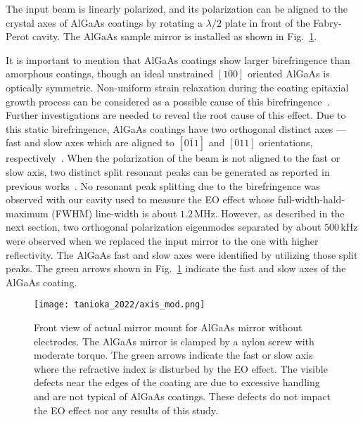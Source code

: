 The input beam is linearly polarized, and its polarization can be aligned to the crystal axes of AlGaAs coatings by rotating a $\lambda/2$ plate in front of the Fabry-Perot cavity.
The AlGaAs sample mirror is installed as shown in Fig.~\ref{fig.mount}.

It is important to mention that AlGaAs coatings show larger birefringence than amorphous coatings, though an ideal unstrained $[100]$ oriented AlGaAs is optically symmetric.
Non-uniform strain relaxation during the coating epitaxial growth process can be considered as a possible cause of this birefringence~\cite{Buckle2018}.
Further investigations are needed to reveal the root cause of this effect.
Due to this static birefringence, AlGaAs coatings have two orthogonal distinct axes --- fast and slow axes which are aligned to $[0\bar{1}1]$ and $[011]$ orientations, respectively~\cite{thorlabs,Winkler2021}.
When the polarization of the beam is not aligned to the fast or slow axis, two distinct split resonant peaks can be generated as reported in previous works~\cite{cole:2013, cole:2016}.
No resonant peak splitting due to the birefringence was observed with our cavity used to measure the EO effect whose full-width-hald-maximum (FWHM) line-width is about $1.2\, \mathrm{MHz}$.
However, as described in the next section, two orthogonal polarization eigenmodes separated by about $500\, \mathrm{kHz}$ were observed when we replaced the input mirror to the one with higher reflectivity.
The AlGaAs fast and slow axes were identified by utilizing those split peaks.
The green arrows shown in Fig.~\ref{fig.mount} indicate the fast and slow axes of the AlGaAs coating.



\begin{figure}[htbp]
    \centering
\texttt{[image: tanioka\_2022/axis\_mod.png]}
\caption{
Front view of actual mirror mount for AlGaAs mirror without electrodes.
The AlGaAs mirror is clamped by a nylon screw with moderate torque.
The green arrows indicate the fast or slow axis where the refractive index is disturbed by the EO effect. The visible defects near the edges of the coating are due to excessive handling and are not typical of AlGaAs coatings. These defects do not impact the EO effect nor any results of this study.
}
\label{fig.mount}
\end{figure}

